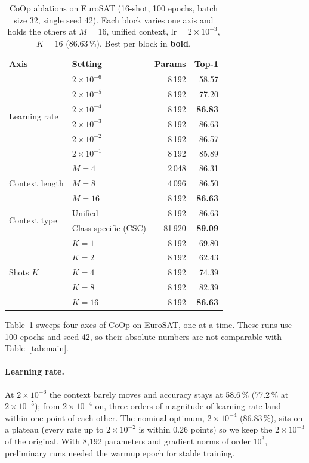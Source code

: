\documentclass[10pt,twocolumn,letterpaper]{article}
\begin{document}
\begin{table}[t]
\centering
\caption{CoOp ablations on EuroSAT (16-shot, 100 epochs, batch size 32,
  single seed 42).  Each block varies one axis and holds the others at
  $M{=}16$, unified context, $\mathrm{lr}=2\times10^{-3}$, $K{=}16$ (86.63\,\%).
  Best per block in \textbf{bold}.}
\label{tab:coop-ablation}
\footnotesize
\setlength{\tabcolsep}{4pt}
\begin{tabular}{@{}llrr@{}}
\toprule
\textbf{Axis} & \textbf{Setting} & \textbf{Params} & \textbf{Top-1} \\
\midrule
\multirow{6}{*}{Learning rate}
  & $2 \times 10^{-6}$ & 8\,192  & 58.57 \\
  & $2 \times 10^{-5}$ & 8\,192  & 77.20 \\
  & $2 \times 10^{-4}$ & 8\,192  & \textbf{86.83} \\
  & $2 \times 10^{-3}$ & 8\,192  & 86.63 \\
  & $2 \times 10^{-2}$ & 8\,192  & 86.57 \\
  & $2 \times 10^{-1}$ & 8\,192  & 85.89 \\
\midrule
\multirow{3}{*}{Context length}
  & $M = 4$  & 2\,048 & 86.31 \\
  & $M = 8$  & 4\,096 & 86.50 \\
  & $M = 16$ & 8\,192 & \textbf{86.63} \\
\midrule
\multirow{2}{*}{Context type}
  & Unified              &  8\,192 & 86.63 \\
  & Class-specific (CSC) & 81\,920 & \textbf{89.09} \\
\midrule
\multirow{5}{*}{Shots $K$}
  & $K = 1$  & 8\,192 & 69.80 \\
  & $K = 2$  & 8\,192 & 62.43 \\
  & $K = 4$  & 8\,192 & 74.39 \\
  & $K = 8$  & 8\,192 & 82.39 \\
  & $K = 16$ & 8\,192 & \textbf{86.63} \\
\bottomrule
\end{tabular}
\end{table}

Table~\ref{tab:coop-ablation} sweeps four axes of CoOp on EuroSAT, one at
a time.  These runs use 100 epochs and seed 42, so their absolute numbers
are not comparable with Table~\ref{tab:main}.

\paragraph{Learning rate.}
At $2\times10^{-6}$ the context barely moves and accuracy stays at
58.6\,\% (77.2\,\% at $2\times10^{-5}$); from $2\times10^{-4}$ on,
three orders of magnitude of learning rate land within one point of each
other.  The nominal optimum, $2\times10^{-4}$ (86.83\,\%), sits on a
plateau (every rate up to $2\times10^{-2}$ is within 0.26 points) so we
keep the $2\times10^{-3}$ of the original.  With 8{,}192 parameters
and gradient norms of order $10^{3}$, preliminary runs needed the warmup
epoch for stable training.
\end{document}
